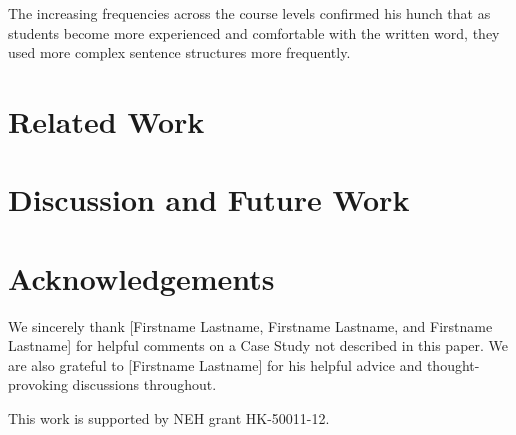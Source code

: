 \documentclass{sig-alternate}
\begin{document}
The increasing frequencies across the course levels confirmed his hunch that as students become more experienced and comfortable with the written word, they used more complex sentence structures more frequently. 

\section {Related Work}

\section{Discussion and Future Work}

\section{Acknowledgements}
We sincerely thank [Firstname Lastname, Firstname Lastname, and Firstname Lastname] for helpful comments on a Case Study not described in this paper. We are also grateful to [Firstname Lastname] for his helpful advice and thought-provoking discussions throughout.

This work is supported by NEH grant HK-50011-12.


 
  
\end{document}
